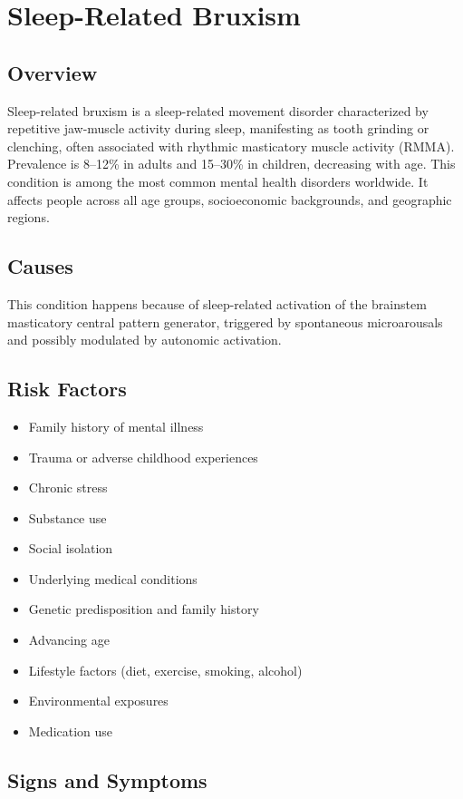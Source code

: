 \chapter{Sleep-Related Bruxism}
\label{sec:Sleep-Related Bruxism}

\section{Overview}
Sleep-related bruxism is a sleep-related movement disorder characterized by repetitive jaw-muscle activity during sleep, manifesting as tooth grinding or clenching, often associated with rhythmic masticatory muscle activity (RMMA). Prevalence is 8--12\% in adults and 15--30\% in children, decreasing with age. This condition is among the most common mental health disorders worldwide. It affects people across all age groups, socioeconomic backgrounds, and geographic regions.
\section{Causes}
This condition happens because of sleep-related activation of the brainstem masticatory central pattern generator, triggered by spontaneous microarousals and possibly modulated by autonomic activation.     
\section{Risk Factors}

\begin{itemize}[noitemsep]
  \item Family history of mental illness
  \item Trauma or adverse childhood experiences
  \item Chronic stress
  \item Substance use
  \item Social isolation
  \item Underlying medical conditions
  \item Genetic predisposition and family history
  \item Advancing age
  \item Lifestyle factors (diet, exercise, smoking, alcohol)
  \item Environmental exposures
  \item Medication use
\end{itemize}
\section{Signs and Symptoms}

